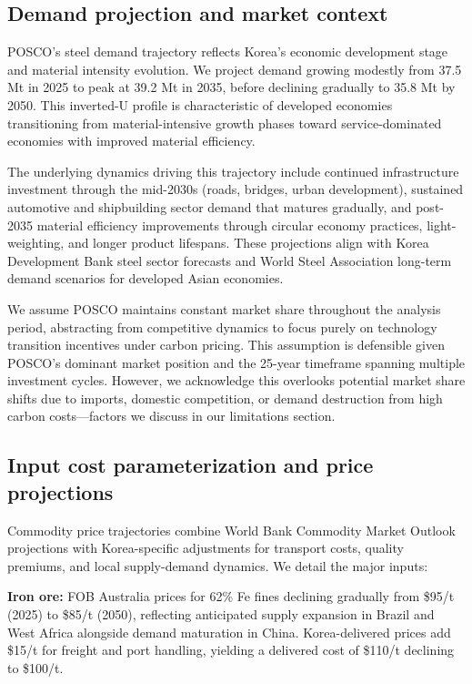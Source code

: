 \subsection{Demand projection and market context}

POSCO's steel demand trajectory reflects Korea's economic development stage and material intensity evolution. We project demand growing modestly from 37.5 Mt in 2025 to peak at 39.2 Mt in 2035, before declining gradually to 35.8 Mt by 2050. This inverted-U profile is characteristic of developed economies transitioning from material-intensive growth phases toward service-dominated economies with improved material efficiency.

The underlying dynamics driving this trajectory include continued infrastructure investment through the mid-2030s (roads, bridges, urban development), sustained automotive and shipbuilding sector demand that matures gradually, and post-2035 material efficiency improvements through circular economy practices, light-weighting, and longer product lifespans. These projections align with Korea Development Bank steel sector forecasts and World Steel Association long-term demand scenarios for developed Asian economies.

We assume POSCO maintains constant market share throughout the analysis period, abstracting from competitive dynamics to focus purely on technology transition incentives under carbon pricing. This assumption is defensible given POSCO's dominant market position and the 25-year timeframe spanning multiple investment cycles. However, we acknowledge this overlooks potential market share shifts due to imports, domestic competition, or demand destruction from high carbon costs—factors we discuss in our limitations section.

\subsection{Input cost parameterization and price projections}

Commodity price trajectories combine World Bank Commodity Market Outlook projections with Korea-specific adjustments for transport costs, quality premiums, and local supply-demand dynamics. We detail the major inputs:

\textbf{Iron ore:} FOB Australia prices for 62\% Fe fines declining gradually from \$95/t (2025) to \$85/t (2050), reflecting anticipated supply expansion in Brazil and West Africa alongside demand maturation in China. Korea-delivered prices add \$15/t for freight and port handling, yielding a delivered cost of \$110/t declining to \$100/t.

